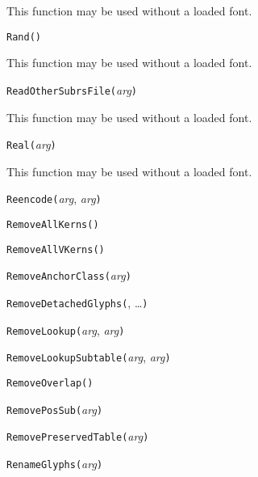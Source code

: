 This function may be used without a loaded font.


\noindent\texttt{Rand(}\texttt{)}

This function may be used without a loaded font.


\noindent\texttt{ReadOtherSubrsFile(}\textit{arg}\texttt{)}

This function may be used without a loaded font.


\noindent\texttt{Real(}\textit{arg}\texttt{)}

This function may be used without a loaded font.


\noindent\texttt{Reencode(}\textit{arg}, \textit{arg}\texttt{)}


\noindent\texttt{RemoveAllKerns(}\texttt{)}


\noindent\texttt{RemoveAllVKerns(}\texttt{)}


\noindent\texttt{RemoveAnchorClass(}\textit{arg}\texttt{)}


\noindent\texttt{RemoveDetachedGlyphs(}, \ldots\texttt{)}


\noindent\texttt{RemoveLookup(}\textit{arg}, \textit{arg}\texttt{)}


\noindent\texttt{RemoveLookupSubtable(}\textit{arg}, \textit{arg}\texttt{)}


\noindent\texttt{RemoveOverlap(}\texttt{)}


\noindent\texttt{RemovePosSub(}\textit{arg}\texttt{)}


\noindent\texttt{RemovePreservedTable(}\textit{arg}\texttt{)}


\noindent\texttt{RenameGlyphs(}\textit{arg}\texttt{)}

